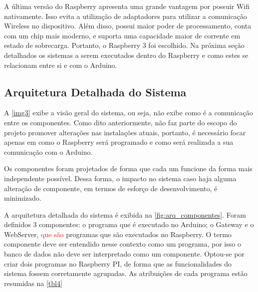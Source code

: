 			A última versão do Raspberry apresenta uma grande vantagem por possuir Wifi nativamente. Isso evita a utilização de adaptadores para utilizar a comunicação Wireless no dispositivo. Além disso, possui maior poder de processamento, conta com um chip mais moderno, e suporta uma capacidade maior de corrente em estado de sobrecarga. Portanto, o Raspberry 3 foi escolhido. Na próxima seção detalhados os sistemas a serem executados dentro do Raspberry e como estes se relacionam entre si e com o Arduino.
			
		\subsection{Arquitetura Detalhada do Sistema}
			A \autoref{img3} exibe a visão geral do sistema, ou seja, não exibe como é a comunicação entre os componentes. Como dito anteriormente, não faz parte do escopo do projeto promover alterações nas instalações atuais, portanto, é necessário focar apenas em como o Raspberry será programado e como será realizada a sua comunicação com o Arduino.
			
			Os componentes foram projetados de forma que cada um funcione da forma mais independente possível. Dessa forma, o impacto no sistema caso haja alguma alteração de componente, em termos de esforço de desenvolvimento, é minimizado.
			
			A arquitetura detalhada do sistema é exibida na \autoref{fig:arq_componentes}. Foram definidos 3 componentes: o programa que é executado no Arduino; o Gateway e o WebServer, \textcolor{red}{que são} programas que são executados no Raspberry. O termo componente deve ser entendido nesse contexto como um programa, por isso o banco de dados não deve ser interpretado como um componente. Optou-se por criar dois programas no Raspberry PI, de forma que as funcionalidades do sistema fossem corretamente agrupadas. As atribuições de cada programa estão resumidas na \autoref{tbl4}
			
